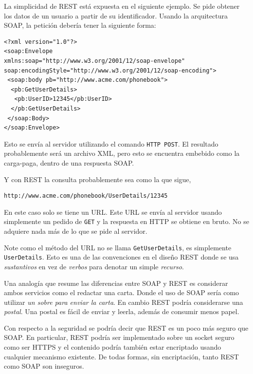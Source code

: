 \documentclass[conference]{IEEEtran}
\begin{document}

La simplicidad de REST está expuesta en el siguiente ejemplo. Se pide
obtener los datos de un usuario a partir de su identificador.
Usando la arquitectura SOAP, la petición debería tener la siguiente
forma:
\begin{lstlisting}[frame=single]
<?xml version="1.0"?>
<soap:Envelope
xmlns:soap="http://www.w3.org/2001/12/soap-envelope"
soap:encodingStyle="http://www.w3.org/2001/12/soap-encoding">
 <soap:body pb="http://www.acme.com/phonebook">
  <pb:GetUserDetails>
   <pb:UserID>12345</pb:UserID>
  </pb:GetUserDetails>
 </soap:Body>
</soap:Envelope>
\end{lstlisting}

Esto se envía al servidor utilizando el comando \texttt{HTTP POST}. El
resultado probablemente será un archivo XML, pero esto
se encuentra embebido como la carga-paga, dentro de una respuesta
SOAP.

Y con REST la consulta probablemente sea como la que sigue,
\begin{lstlisting}[frame=single]
http://www.acme.com/phonebook/UserDetails/12345
\end{lstlisting}

En este caso solo se tiene un URL. Este URL se envía al servidor
usando simplemente un pedido de \texttt{GET} y la respuesta en HTTP se
obtiene en bruto. No se adquiere nada más de lo que se pide al
servidor. 

Note como el método del URL no se llama \texttt{GetUserDetails}, es
simplemente \texttt{UserDetails}. Esto es una de las convenciones en
el diseño REST donde se usa  \emph{sustantivos} en vez de
\emph{verbos} para denotar un simple \emph{recurso}.

Una analogía que resume las diferencias entre SOAP y REST es
considerar ambos servicios como el redactar una carta. Donde el uso de
SOAP sería como utilizar \emph{un sobre para enviar la carta}. En
cambio REST podría considerarse una \emph{postal}. Una postal es fácil
de enviar y leerla, además de consumir menos papel.

Con respecto a la seguridad se podría decir que REST es un poco más
seguro que SOAP. En particular, REST podría ser implementado sobre un
socket seguro como ser HTTPS y el contenido podría también estar
encriptado usando cualquier mecanismo existente. De todas formas, sin
encriptación, tanto REST como SOAP son inseguros. 
\end{document}
